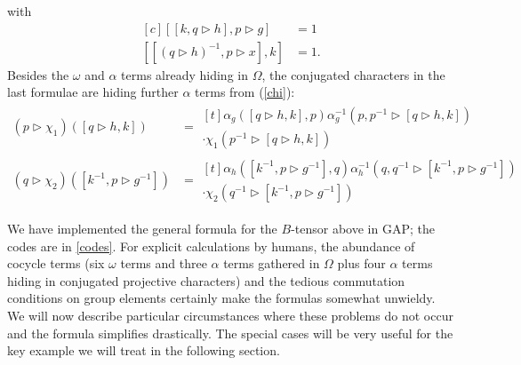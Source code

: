 \documentclass[a4paper, 10pt]{book}
\theoremstyle{definition}
\numberwithin{equation}{chapter}
\newcommand\hit{\triangleright}
\begin{document}
with
\begin{equation}
\label{eq:condition3}
\begin{aligned}[c]
 [[k, q\hit h], p\hit g] &= 1\\ 
 [[(q\hit h)^{-1}, p\hit x],k]&=1.
\end{aligned}
\end{equation}
Besides the $\omega$ and $\alpha$ terms already hiding in $\Omega$, the conjugated characters in the last formulae are hiding further $\alpha$ terms from (\cref{chi}):
\begin{align*}
  (p\hit \chi_{1})([q\hit h, k]) &=\begin{aligned}[t]\alpha_{g} ([q\hit h, k], p) \alpha^{-1}_{g}(p, p^{-1} \hit [q\hit h, k])\\\cdot\chi_1(p^{-1} \hit [q\hit h, k])&
  \end{aligned}
  \\
(q\hit \chi_{2})([k^{-1}, p\hit g^{-1}])&=\begin{aligned}[t] \alpha_{h}([k^{-1}, p\hit g^{-1}],q) \alpha^{-1}_{h} (q, q^{-1} \hit [k^{-1}, p\hit g^{-1}])&\\\cdot\chi_2(q^{-1}\hit[k^{-1}, p\hit g^{-1}])&
\end{aligned}
\end{align*}


We have implemented the general formula for the $B$-tensor above in GAP; the codes are in \cref{codes}. For explicit calculations by humans, the abundance of cocycle terms (six $\omega$ terms and three $\alpha$ terms gathered in $\Omega$ plus four $\alpha$ terms hiding in conjugated projective characters) and the tedious commutation conditions on group elements certainly make the formulas somewhat unwieldy. We will now describe particular circumstances where these problems do not occur and the formula simplifies drastically. The special cases will be very useful for the key example we will treat in the following section.
\end{document}
